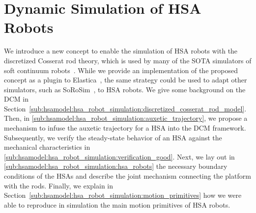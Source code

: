 \section{Dynamic Simulation of HSA Robots}\label{sec:hsamodel:hsa_robot_simulation}
We introduce a new concept to enable the simulation of \gls{HSA} robots with the discretized Cosserat rod theory, which is used by many of the \gls{SOTA} simulators of soft continuum robots~\citep{naughton2021elastica, mathew2022sorosim}.
While we provide an implementation of the proposed concept as a plugin to Elastica~\citep{naughton2021elastica}, the same strategy could be used to adapt other simulators, such as SoRoSim~\citep{mathew2022sorosim}, to \gls{HSA} robots.
%
We give some background on the \gls{DCM} in Section~\ref{sub:hsamodel:hsa_robot_simulation:discretized_cosserat_rod_model}. Then, in \ref{sub:hsamodel:hsa_robot_simulation:auxetic_trajectory}, we propose a mechanism to infuse the auxetic trajectory for a \gls{HSA} into the \gls{DCM} framework. Subsequently, we verify the steady-state behavior of an \gls{HSA} against the mechanical characteristics in \ref{sub:hsamodel:hsa_robot_simulation:verification_good}. Next, we lay out in \ref{sub:hsamodel:hsa_robot_simulation:hsa_robots} the necessary boundary conditions of the \glspl{HSA} and describe the joint mechanism connecting the platform with the rods. Finally, we explain in Section~\ref{sub:hsamodel:hsa_robot_simulation:motion_primitives} how we were able to reproduce in simulation the main motion primitives of \gls{HSA} robots.

